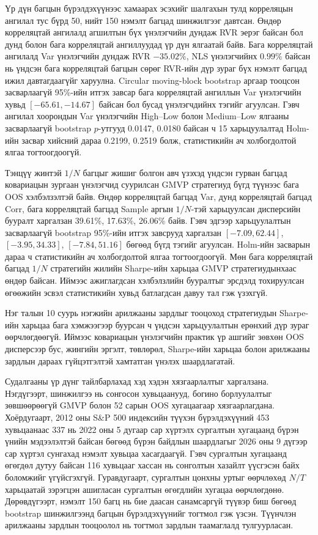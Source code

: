 Үр дүн багцын бүрэлдэхүүнээс хамаарах эсэхийг шалгахын тулд корреляцын ангилал тус бүрд 50, нийт 150 нэмэлт багцад шинжилгээг давтсан. Өндөр корреляцтай ангилалд агшилтын бүх үнэлэгчийн дундаж RVR эерэг байсан бол дунд болон бага корреляцтай ангиллуудад үр дүн ялгаатай байв. Бага корреляцтай ангилалд Var үнэлэгчийн дундаж RVR $-35.02\%$, NLS үнэлэгчийнх $0.99\%$ байсан нь үндсэн бага корреляцтай багцын сөрөг RVR-ийн дүр зураг бүх нэмэлт багцад ижил давтагдаагүйг харуулна. Circular moving-block bootstrap аргаар тооцсон засварлаагүй 95\%-ийн итгэх завсар бага корреляцтай ангиллын Var үнэлэгчийн хувьд $[-65.61,-14.67]$ байсан бол бусад үнэлэгчдийнх тэгийг агуулсан. Гэвч ангилал хоорондын Var үнэлэгчийн High--Low болон Medium--Low ялгааны засварлаагүй bootstrap $p$-утгууд 0.0147, 0.0180 байсан ч 15 харьцуулалтад Holm-ийн засвар хийсний дараа 0.2199, 0.2519 болж, статистикийн ач холбогдолтой ялгаа тогтоогдоогүй.

Тэнцүү жинтэй $1/N$ багцыг жишиг болгон авч үзэхэд үндсэн гурван багцад ковариацын зургаан үнэлэгчид суурилсан GMVP стратегиуд бүгд түүнээс бага OOS хэлбэлзэлтэй байв. Өндөр корреляцтай багцад Var, дунд корреляцтай багцад Corr, бага корреляцтай багцад Sample аргын $1/N$-тэй харьцуулсан дисперсийн бууралт харгалзан 39.61\%, 17.63\%, 26.06\% байв. Гэвч эдгээр харьцуулалтын засварлаагүй bootstrap 95\%-ийн итгэх завсрууд харгалзан $[-7.09,62.44]$, $[-3.95,34.33]$, $[-7.84,51.16]$ бөгөөд бүгд тэгийг агуулсан. Holm-ийн засварын дараа ч статистикийн ач холбогдолтой ялгаа тогтоогдоогүй. Мөн бага корреляцтай багцад $1/N$ стратегийн жилийн Sharpe-ийн харьцаа GMVP стратегиудынхаас өндөр байсан. Иймээс ажиглагдсан хэлбэлзлийн бууралтыг эрсдэлд тохируулсан өгөөжийн эсвэл статистикийн хувьд батлагдсан давуу тал гэж үзэхгүй.

Нэг талын 10 суурь нэгжийн арилжааны зардлыг тооцоход стратегиудын Sharpe-ийн харьцаа бага хэмжээгээр буурсан ч үндсэн харьцуулалтын ерөнхий дүр зураг өөрчлөгдөөгүй. Иймээс ковариацын үнэлэгчийн практик үр ашгийг зөвхөн OOS дисперсээр бус, жингийн эргэлт, төвлөрөл, Sharpe-ийн харьцаа болон арилжааны зардлын дараах гүйцэтгэлтэй хамтатган үнэлэх шаардлагатай.

Судалгааны үр дүнг тайлбарлахад хэд хэдэн хязгаарлалтыг харгалзана. Нэгдүгээрт, шинжилгээ нь сонгосон хувьцаанууд, богино борлуулалтыг зөвшөөрөөгүй GMVP болон 52 сарын OOS хугацаагаар хязгаарлагдана. Хоёрдугаарт, 2012 оны S\&P 500 индексийн түүхэн бүрэлдэхүүний 453 хувьцаанаас 337 нь 2022 оны 5 дугаар сар хүртэлх сургалтын хугацаанд бүрэн үнийн мэдээлэлтэй байсан бөгөөд бүрэн байдлын шаардлагыг 2026 оны 9 дүгээр сар хүртэл сунгахад нэмэлт хувьцаа хасагдаагүй. Гэвч сургалтын хугацаанд өгөгдөл дутуу байсан 116 хувьцааг хассан нь сонголтын хазайлт үүсгэсэн байх боломжийг үгүйсгэхгүй. Гуравдугаарт, сургалтын цонхны уртыг өөрчлөхөд $N/T$ харьцаатай зэрэгцэн ашигласан сургалтын өгөгдлийн хугацаа өөрчлөгдөнө. Дөрөвдүгээрт, нэмэлт 150 багц нь бие даасан санамсаргүй түүвэр биш бөгөөд bootstrap шинжилгээнд багцын бүрэлдэхүүнийг тогтмол гэж үзсэн. Түүнчлэн арилжааны зардлын тооцоолол нь тогтмол зардлын таамаглалд тулгуурласан.

